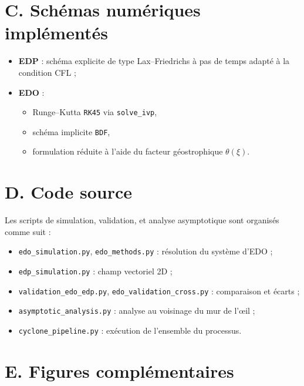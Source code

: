 \section*{C. Sch\'emas num\'eriques impl\'ement\'es}
\begin{itemize}
    \item \textbf{EDP} : sch\'ema explicite de type Lax--Friedrichs \`a pas de temps adapt\'e \`a la condition CFL ;
    \item \textbf{EDO} :
    \begin{itemize}
        \item Runge--Kutta \texttt{RK45} via \texttt{solve\_ivp},
        \item sch\'ema implicite \texttt{BDF},
        \item formulation r\'eduite \`a l'aide du facteur g\'eostrophique $\theta(\xi)$.
    \end{itemize}
\end{itemize}

\section*{D. Code source}
Les scripts de simulation, validation, et analyse asymptotique sont organis\'es comme suit :
\begin{itemize}
    \item \texttt{edo\_simulation.py}, \texttt{edo\_methods.py} : r\'esolution du syst\`eme d'EDO ;
    \item \texttt{edp\_simulation.py} : champ vectoriel 2D ;
    \item \texttt{validation\_edo\_edp.py}, \texttt{edo\_validation\_cross.py} : comparaison et \'ecarts ;
    \item \texttt{asymptotic\_analysis.py} : analyse au voisinage du mur de l'\oe il ;
    \item \texttt{cyclone\_pipeline.py} : ex\'ecution de l'ensemble du processus.
\end{itemize}

\section*{E. Figures compl\'ementaires}


